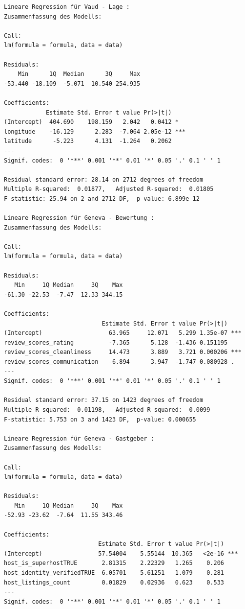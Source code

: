 \documentclass[
  journal,
]{IEEEtran}%
\begin{document}
\begin{verbatim}
Lineare Regression für Vaud - Lage :
Zusammenfassung des Modells:

Call:
lm(formula = formula, data = data)

Residuals:
    Min      1Q  Median      3Q     Max 
-53.440 -18.109  -5.071  10.540 254.935 

Coefficients:
            Estimate Std. Error t value Pr(>|t|)    
(Intercept)  404.690    198.159   2.042   0.0412 *  
longitude    -16.129      2.283  -7.064 2.05e-12 ***
latitude      -5.223      4.131  -1.264   0.2062    
---
Signif. codes:  0 '***' 0.001 '**' 0.01 '*' 0.05 '.' 0.1 ' ' 1

Residual standard error: 28.14 on 2712 degrees of freedom
Multiple R-squared:  0.01877,   Adjusted R-squared:  0.01805 
F-statistic: 25.94 on 2 and 2712 DF,  p-value: 6.899e-12

Lineare Regression für Geneva - Bewertung :
Zusammenfassung des Modells:

Call:
lm(formula = formula, data = data)

Residuals:
   Min     1Q Median     3Q    Max 
-61.30 -22.53  -7.47  12.33 344.15 

Coefficients:
                            Estimate Std. Error t value Pr(>|t|)    
(Intercept)                   63.965     12.071   5.299 1.35e-07 ***
review_scores_rating          -7.365      5.128  -1.436 0.151195    
review_scores_cleanliness     14.473      3.889   3.721 0.000206 ***
review_scores_communication   -6.894      3.947  -1.747 0.080928 .  
---
Signif. codes:  0 '***' 0.001 '**' 0.01 '*' 0.05 '.' 0.1 ' ' 1

Residual standard error: 37.15 on 1423 degrees of freedom
Multiple R-squared:  0.01198,   Adjusted R-squared:  0.0099 
F-statistic: 5.753 on 3 and 1423 DF,  p-value: 0.000655

Lineare Regression für Geneva - Gastgeber :
Zusammenfassung des Modells:

Call:
lm(formula = formula, data = data)

Residuals:
   Min     1Q Median     3Q    Max 
-52.93 -23.62  -7.64  11.55 343.46 

Coefficients:
                           Estimate Std. Error t value Pr(>|t|)    
(Intercept)                57.54004    5.55144  10.365   <2e-16 ***
host_is_superhostTRUE       2.81315    2.22329   1.265    0.206    
host_identity_verifiedTRUE  6.05701    5.61251   1.079    0.281    
host_listings_count         0.01829    0.02936   0.623    0.533    
---
Signif. codes:  0 '***' 0.001 '**' 0.01 '*' 0.05 '.' 0.1 ' ' 1


\end{verbatim}
\end{document}
